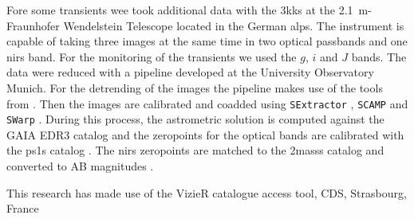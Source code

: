 \documentclass[11pt]{article}
\begin{document}
Fore some transients wee took additional data with the \glspl{3kk} \citep{2016SPIE.9908E..44L} at the \SI{2.1}{\meter}-Fraunhofer Wendelstein Telescope \citep{2014SPIE.9145E..2DH} located in the German alps.
The instrument is capable of taking three images at the same time in two optical passbands and one \glspl{nir} band.
For the monitoring of the transients we used the $g$, $i$ and $J$ bands.
The data were reduced with a pipeline developed at the University Observatory Munich.
For the detrending of the images the pipeline makes use of the tools from \cite{2002A&A...381.1095G}.
Then the images are calibrated and coadded using \texttt{SExtractor} \citep{1996A&AS..117..393B}, \texttt{SCAMP} \citep{2006ASPC..351..112B} and \texttt{SWarp} \citep{2002ASPC..281..228B}.
During this process, the astrometric solution is computed against the GAIA EDR3 catalog \citep{2021A&A...649A...1G} and the zeropoints for the optical bands are calibrated with the \glspl{ps1} catalog \citep{2013ApJS..205...20M}.
The \glspl{nir} zeropoints are matched to the \glspl{2mass} catalog \citep{2006AJ....131.1163S} and converted to AB magnitudes \citep{2007AJ....133..734B}.


This research has made use of the VizieR catalogue access tool, CDS, Strasbourg, France


\end{document}
